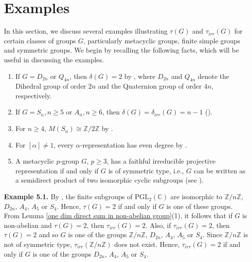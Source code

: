 \documentclass[a4paper,11pt]{amsart}
\numberwithin{equation}{section}
\numberwithin{equation}{subsection}
\newcommand{\C}{\mathbb{C}}
\newcommand{\Z}{\mathbb{Z}}
\newcommand{\tg}{\tau(G)}
\newcommand{\ti}{\tau_{irr}(G)}
\begin{document}
\section{Examples} \label{additional} 


In this section, we discuss several examples illustrating $\tau(G)$ and $\tau_{irr}(G)$ for certain classes of groups $G$, particularly metacyclic groups, finite simple groups and symmetric groups. 
We begin by recalling the following facts, which will be useful in discussing the examples.
\begin{enumerate}
	\item  If $G= D_{2n}$ or $Q_{4n}$, then $\delta(G)= 2$ by \cite[Example 2.2]{kaur}, where $D_{2n}$ and $Q_{4n}$ denote the Dihedral group of order $2n$ and the Quaternion group of order $4n$, respectively.
	\item If $G= S_n, n \geq 5$ or $A_n, n \geq 6$, then $\delta(G) = \delta_{irr}(G)= n-1$ (\cite[Example 2.4, 2.5, 2.6]{kaur}).
	\item  For $n \geq 4$, $M(S_n) \cong \Z/2\Z$ by \cite[Chapter 4, Theorem 8.3(i)]{karpilovsky}. 
	\item For $[\alpha] \neq 1$, every $\alpha$-representation has even degree by \cite[Chapter 5, Theorem 5.3]{karpilovsky3}. 
	
	\item A metacyclic $p$-group $G$, $p \ge 3$, has a faithful irreducible projective representation if and only if $G$ is of symmetric type, i.e., $G$ can be written as a semidirect product of two isomorphic cyclic subgroups  (see \cite [Theorem 5.2]{NG}).
\end{enumerate}

\textbf{Example 5.1.} \label{tau(G) = 2}
By \cite[Section 1.1]{Dolgachev}, the finite subgroups of $\mathrm{PGL}_2(\C)$ are isomorphic to $\Z/n\Z$, $D_{2n}$, $A_4$, $A_5$ or $S_4$. Hence, $\tg = 2$ if and only if $G$ is one of these groups. 
From Lemma \ref{one dim direct sum in non-abelian group}(1), it follows that if $G$ is non-abelian and $\tg = 2$, then $\ti= 2$. Also, if $\ti= 2$, then $\tg= 2$ and so $G$ is one of the groups $\Z/n\Z$, $D_{2n}$, $A_4$, $A_5$ or $S_4$. Since $\Z/n\Z$ is not of symmetric type, $\tau_{irr}(\Z/n\Z)$ does not exist. Hence, $\ti =2$ if and only if $G$ is one of the groups $D_{2n}$, $A_4$, $A_5$ or $S_4$. \\
\end{document}
